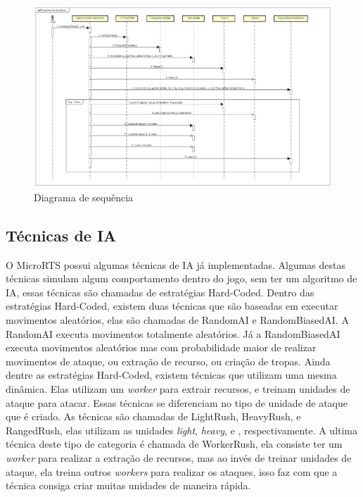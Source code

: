 \begin{figure}[ht]
	\centering
	\includegraphics[width=1\textwidth]{fig/diagramaSequencia.pdf}
	\caption{Diagrama de sequência}
	\label{fig:sequencia}
\end{figure}

\subsection{Técnicas de IA} \label{sec:tecn}

O MicroRTS possui algumas técnicas de IA já implementadas.
Algumas destas técnicas simulam algum comportamento dentro do jogo, sem ter um algoritmo de IA, essas técnicas são chamadas de estratégias Hard-Coded. 
Dentro das estratégias Hard-Coded, existem duas técnicas que são baseadas em executar movimentos aleatórios, elas são chamadas de RandomAI e RandomBiasedAI.
A RandomAI executa movimentos totalmente aleatórios.
Já a RandomBiasedAI executa movimentos aleatórios mas com probabilidade maior de realizar movimentos de ataque, ou extração de recurso, ou criação de tropas.
Ainda dentre as estratégias Hard-Coded, existem técnicas que utilizam uma mesma dinâmica. 
Elas utilizam um \textit{worker} para extrair recursos, e treinam unidades de ataque para atacar. 
Essas técnicas se diferenciam no tipo de unidade de ataque que é criado. 
As técnicas são chamadas de LightRush, HeavyRush, e RangedRush, elas utilizam as unidades \textit{light}, \textit{heavy}, e , respectivamente.
A ultima técnica deste tipo de categoria é chamada de WorkerRush, ela consiste ter um \textit{worker} para realizar a extração de recursos, mas ao invés de treinar unidades de ataque, ela treina outros \textit{workers} para realizar os ataques, isso faz com que a técnica consiga criar muitas unidades de maneira rápida.

